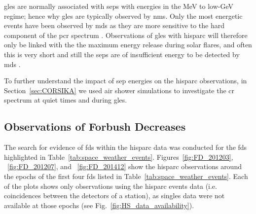 \glspl{gle} are normally associated with \glspl{sep} with energies in the MeV to low-GeV regime; hence why \glspl{gle} are typically observed by \glspl{nm}. Only the most energetic events have been observed by \glspl{md} as they are more sensitive to the hard component of the \gls{pcr} spectrum \citep{augusto_signals_2016}. Observations of \glspl{gle} with \gls{hisparc} will therefore only be linked with the the maximum energy release during solar flares, and often this is very short and still the \glspl{sep} are of insufficient energy to be detected by \glspl{md} \citep{mccracken_high-energy_2012, augusto_signals_2016}. 

To further understand the impact of \gls{sep} energies on the \gls{hisparc} observations, in Section~\ref{sec:CORSIKA} we used air shower simulations to investigate the \gls{cr} spectrum at quiet times and during \glspl{gle}. %


\subsection{Observations of Forbush Decreases}


The search for evidence of \glspl{fd} within the \gls{hisparc} data was conducted for the \glspl{fd} highlighted in Table~\ref{tab:space_weather_events}. Figures~\ref{fig:FD_201203}, ~\ref{fig:FD_201207}, and ~\ref{fig:FD_201412} show the \gls{hisparc} observations around the epochs of the first four \glspl{fd} listed in Table~\ref{tab:space_weather_events}. Each of the plots shows only observations using the \gls{hisparc} events data (i.e. coincidences between the detectors of a station), as singles data were not available at those epochs (see Fig.~\ref{fig:HS_data_availability}).

